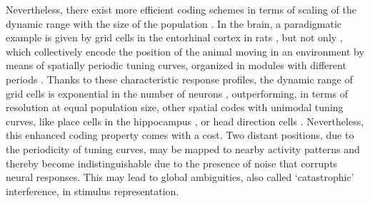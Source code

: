 \documentclass[a4paper]{article}
\begin{document}
Nevertheless, there exist more efficient coding schemes in terms of scaling of the dynamic range with the size of the population \cite[]{Shannon1948ACommunication}. In the brain, a
paradigmatic example is given by grid cells in the entorhinal cortex in rats \cite[]{Hafting2005MicrostructureCortex}, but not only \cite[]{Killian2012ACortex}, which collectively encode the position of the animal moving in an environment by means of spatially periodic tuning curves, organized in modules with different periods \cite{Fiete2008WhatLocation,Wei2015ACells}. Thanks to these characteristic response profiles, the dynamic range of grid cells is exponential in the number of neurons \cite{Sreenivasan2011GridComputation,Mathis2012ResolutionNeurons}, outperforming, in terms of resolution at equal population size, other spatial codes with unimodal tuning curves, like place cells in the hippocampus \cite{Hartley2014SpaceCognition,Mathis2012OptimalOf}, or head direction cells \cite{Taube1990Head-directionAnalysis}.
Nevertheless, this enhanced coding property comes with a cost. Two distant positions, due to the periodicity of tuning curves, may be mapped to nearby activity patterns and thereby become indistinguishable due to the presence of noise that corrupts neural responses. This may lead to global ambiguities, also called `catastrophic' interference, in stimulus representation.
\end{document}
